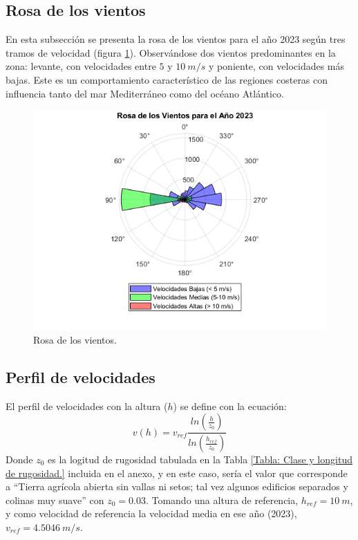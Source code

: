 \documentclass{IEEEtran}
\begin{document}
\subsection{Rosa de los vientos}

En esta subsección se presenta la rosa de los vientos para el año 2023 según tres tramos de velocidad (figura \ref{fig: Rosa de los vientos}). Observándose dos vientos predominantes en la zona: levante, con velocidades entre $5$ y $10\ m/s$  y poniente, con velocidades más bajas. Este es un comportamiento característico de las regiones costeras con influencia tanto del mar Mediterráneo como del océano Atlántico.

\begin{figure}[h]
    \centering
    \includegraphics[width = 0.5 \textwidth]{Imagenes/Rosa de los Vientos.png}
    \caption{Rosa de los vientos.}
    \label{fig: Rosa de los vientos}
\end{figure}

\subsection{Perfil de velocidades}

El perfil de velocidades con la altura ($h$) se define con la ecuación:
\begin{equation}
    v(h) = v_{ref} \frac{ln \left( \frac{h}{z_0} \right)}{ln \left( \frac{h_{ref}}{z_0} \right)}
    \label{eq: Perfil de Velocidades}
\end{equation}
Donde $z_0$ es la logitud de rugosidad tabulada en la Tabla \ref{Tabla: Clase y longitud de rugosidad.} incluida en el anexo, y en este caso, sería el valor que corresponde a ``Tierra agrícola abierta sin vallas ni setos; tal vez algunos edificios separados y colinas muy suave'' con  $z_0 = 0.03$. Tomando una altura de referencia, $h_{ref} = 10\ m$, y como velocidad de referencia la velocidad media en ese año (2023), $v_{ref} = 4.5046\ m/s$. 
\end{document}

